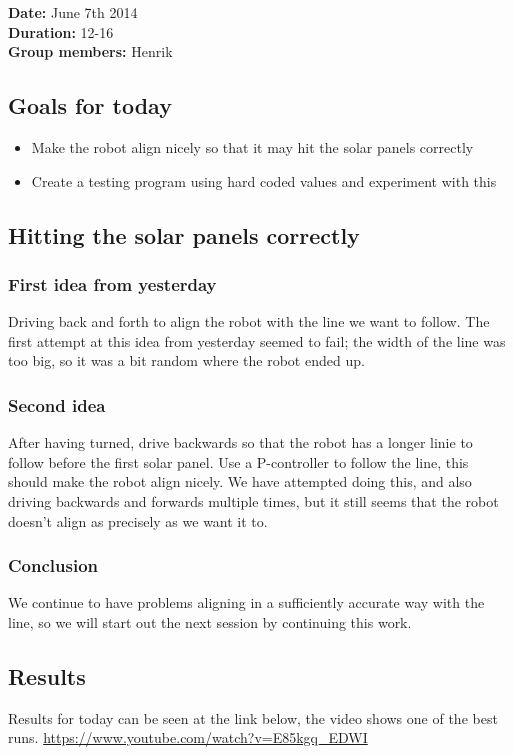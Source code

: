 \textbf{Date:} June 7th 2014\\\textbf{Duration:} 12-16\\\textbf{Group
members:} Henrik

\subsection{Goals for today}

\begin{itemize}
\itemsep1pt\parskip0pt
\item
  Make the robot align nicely so that it may hit the solar panels
  correctly
\item
  Create a testing program using hard coded values and experiment with
  this
\end{itemize}

\subsection{Hitting the solar panels correctly}

\subsubsection{First idea from yesterday}

Driving back and forth to align the robot with the line we want to
follow. The first attempt at this idea from yesterday seemed to fail;
the width of the line was too big, so it was a bit random where the
robot ended up.

\subsubsection{Second idea}

After having turned, drive backwards so that the robot has a longer
linie to follow before the first solar panel. Use a P-controller to
follow the line, this should make the robot align nicely. We have
attempted doing this, and also driving backwards and forwards multiple
times, but it still seems that the robot doesn't align as precisely as
we want it to.

\subsubsection{Conclusion}

We continue to have problems aligning in a sufficiently accurate way
with the line, so we will start out the next session by continuing this
work.

\subsection{Results}

Results for today can be seen at the link below, the video shows one of
the best runs. \url{https://www.youtube.com/watch?v=E85kgq_EDWI}

